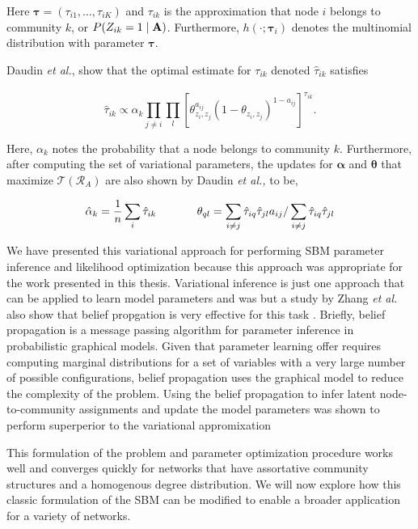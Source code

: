 Here ${\boldsymbol \tau}=(\tau_{i1}, \dots, \tau_{iK})$ and $\tau_{ik}$ is the approximation that node $i$ belongs to community $k$, or $P(Z_{ik}=1 \mid {\bf A})$. Furthermore, $h(\cdot;{\boldsymbol \tau}_{i})$ denotes the multinomial distribution with parameter ${\boldsymbol \tau}$. 

Daudin \cite{dudin} \emph{et al.}, show that the optimal estimate for $\tau_{ik}$ denoted $\hat{\tau}_{ik}$ satisfies

\begin{equation}
\hat{\tau}_{ik} \propto \alpha_{k}\prod_{j \ne i}\prod_{l}[\theta_{z_{i},z_{j}}^{a_{ij}}(1-\theta_{z_{i},z_{j}})^{1-a_{ij}}]^{\hat{\tau}_{ik}}.
\end{equation}

Here, $\alpha_{k}$ notes the probability that a node belongs to community $k$. Furthermore, after computing the set of variational parameters, the updates for ${\boldsymbol \alpha}$ and ${\boldsymbol \theta}$ that maximize $\mathcal{T}(\mathcal{R}_{A})$ are also shown by Daudin \emph{et al.,} \cite{dudin} to be,

\begin{equation}
\hat{\alpha}_{k}=\frac{1}{n}\sum_{i}\hat{\tau}_{ik}  \hspace{.5in}  {\theta}_{ql}=\sum_{i \ne j}\hat{\tau}_{iq}\hat{\tau}_{jl}a_{ij}/\sum_{i \ne j}\hat{\tau}_{iq}\hat{\tau}_{jl}
\end{equation}

We have presented this variational approach for performing SBM parameter inference and likelihood optimization because this approach was appropriate for the work presented in this thesis. Variational inference is just one approach that can be applied to learn model parameters and was but a study by  Zhang \emph{et al.} \cite{comp} also show that belief propgation is very effective for this task \cite{belief}. Briefly, belief propagation is a message passing algorithm for parameter inference in probabilistic graphical models. Given that parameter learning offer requires computing marginal distributions for a set of variables with a very large number of possible configurations, belief propagation uses the graphical model to reduce the complexity of the problem.  Using the belief propagation to infer latent node-to-community assignments and update the model parameters was shown to perform superperior to the variational appromixation


This formulation of the problem and parameter optimization procedure works well and converges quickly for networks that have assortative community structures and a homogenous degree distribution. We will now explore how this classic formulation of the SBM can be modified to enable a broader application for a variety of networks.

